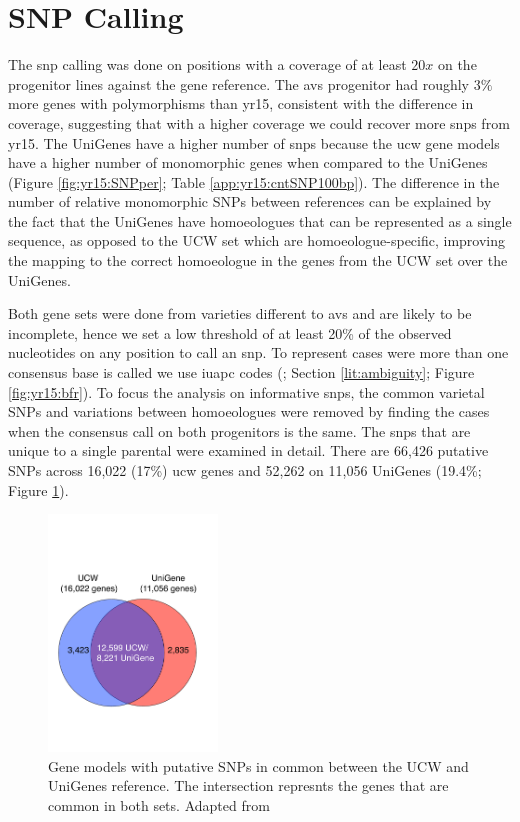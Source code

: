\section{SNP Calling}
\label{yr15:snpCalling}

The \gls{snp} calling was done on positions with a coverage of at least $20x$ on the progenitor lines against the gene reference. The \gls{avs} progenitor had roughly $3\%$ more genes with polymorphisms than \gls{yr15}, consistent with the difference in coverage, suggesting that with a higher coverage we could recover more \gls{snp}s from \gls{yr15}.
The UniGenes have a higher number of \gls{snp}s because the \gls{ucw} gene models have a higher number of monomorphic genes when compared to the UniGenes (Figure \ref{fig:yr15:SNPper}; Table \ref{app:yr15:cntSNP100bp}). 
The difference in the number of relative monomorphic SNPs between references can be explained by the fact that the UniGenes have homoeologues that can be represented as a single sequence, as opposed to the UCW set which are homoeologue-specific, improving the mapping to the correct homoeologue in the genes from the UCW set over the UniGenes.




Both gene sets were done from varieties different to \gls{avs} and are likely to be incomplete, hence we set a low threshold of at least 20\% of the observed nucleotides on any position to call an \gls{snp}. 
To represent cases were more than one consensus base is called we use \gls{iuapc} codes (\citet{Cornish-Bowden1985}; Section \ref{lit:ambiguity}; Figure \ref{fig:yr15:bfr}).  
To focus the analysis on informative \gls{snp}s, the common varietal SNPs and variations between homoeologues were removed by finding the cases when the consensus call on both progenitors is the same. 
The \gls{snp}s that are unique to a single parental were examined in detail. 
There are 66,426 putative SNPs across 16,022 (17\%) \gls{ucw} genes and 52,262  on 11,056 UniGenes (19.4\%; Figure \ref{fig:yr15:geneCount}).  

\begin{figure}
    \includegraphics[width=0.4\textwidth]{Yr15/Figures/geneCounts.pdf} 
    \caption[Gene models with putative SNPs]{Gene models with putative SNPs in common between the UCW and UniGenes reference. The intersection represnts the genes that are common in both sets. Adapted from \citet{Ramirez-Gonzalez2015b}}
    \label{fig:yr15:geneCount}
\end{figure}

